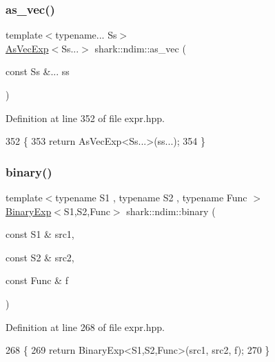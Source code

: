 \subsubsection{\texorpdfstring{as\+\_\+vec()}{as\_vec()}}
{\footnotesize\ttfamily template$<$typename... Ss$>$ \\
\hyperlink{classshark_1_1ndim_1_1_as_vec_exp}{As\+Vec\+Exp}$<$Ss...$>$ shark\+::ndim\+::as\+\_\+vec (\begin{DoxyParamCaption}\item[{const Ss \&...}]{ss }\end{DoxyParamCaption})}



Definition at line 352 of file expr.\+hpp.


\begin{DoxyCode}
352                                                 \{
353             \textcolor{keywordflow}{return} AsVecExp<Ss...>(ss...);
354         \}
\end{DoxyCode}
\hypertarget{namespaceshark_1_1ndim_ab41df8eae2cf48f08d7d547d24268145}{}\label{namespaceshark_1_1ndim_ab41df8eae2cf48f08d7d547d24268145} 
\subsubsection{\texorpdfstring{binary()}{binary()}}
{\footnotesize\ttfamily template$<$typename S1 , typename S2 , typename Func $>$ \\
\hyperlink{classshark_1_1ndim_1_1_binary_exp}{Binary\+Exp}$<$S1,S2,Func$>$ shark\+::ndim\+::binary (\begin{DoxyParamCaption}\item[{const S1 \&}]{src1,  }\item[{const S2 \&}]{src2,  }\item[{const Func \&}]{f }\end{DoxyParamCaption})}



Definition at line 268 of file expr.\+hpp.


\begin{DoxyCode}
268                                                                                     \{
269             \textcolor{keywordflow}{return} BinaryExp<S1,S2,Func>(src1, src2, f);
270         \}
\end{DoxyCode}
\hypertarget{namespaceshark_1_1ndim_a18f6c04b5497740c4bea65b1a77f8797}{}\label{namespaceshark_1_1ndim_a18f6c04b5497740c4bea65b1a77f8797} 
